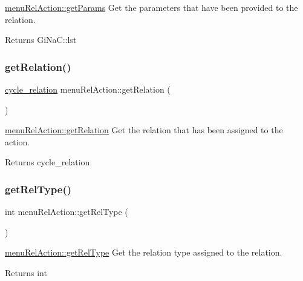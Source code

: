 \mbox{\hyperlink{classmenu_rel_action_a8da5cc4f4063d4ea465d67b0aabc57e7}{menu\+Rel\+Action\+::get\+Params}} Get the parameters that have been provided to the relation. 

\begin{DoxyReturn}{Returns}
Gi\+Na\+C\+::lst 
\end{DoxyReturn}
\mbox{\label{classmenu_rel_action_a34deae132c511b7e34af97585df9245c}} 
\subsubsection{\texorpdfstring{get\+Relation()}{getRelation()}}
{\footnotesize\ttfamily \mbox{\hyperlink{class_moeb_inv_1_1cycle__relation}{cycle\+\_\+relation}} menu\+Rel\+Action\+::get\+Relation (\begin{DoxyParamCaption}{ }\end{DoxyParamCaption})}



\mbox{\hyperlink{classmenu_rel_action_a34deae132c511b7e34af97585df9245c}{menu\+Rel\+Action\+::get\+Relation}} Get the relation that has been assigned to the action. 

\begin{DoxyReturn}{Returns}
cycle\+\_\+relation 
\end{DoxyReturn}
\mbox{\label{classmenu_rel_action_a1092ced0a224fdb4c8f5a0b12548a120}} 
\subsubsection{\texorpdfstring{get\+Rel\+Type()}{getRelType()}}
{\footnotesize\ttfamily int menu\+Rel\+Action\+::get\+Rel\+Type (\begin{DoxyParamCaption}{ }\end{DoxyParamCaption})}



\mbox{\hyperlink{classmenu_rel_action_a1092ced0a224fdb4c8f5a0b12548a120}{menu\+Rel\+Action\+::get\+Rel\+Type}} Get the relation type assigned to the relation. 

\begin{DoxyReturn}{Returns}
int 
\end{DoxyReturn}
\mbox{\label{classmenu_rel_action_a5e6339dbaf4cf0dc9543afdfc5b9e15a}} 
